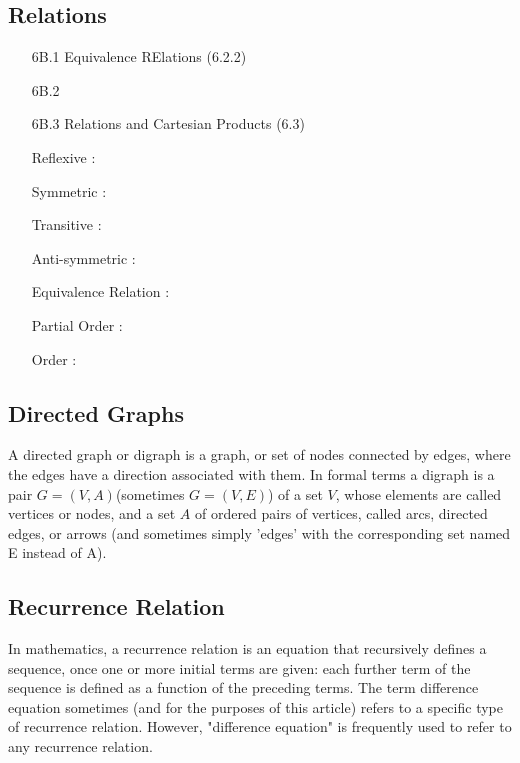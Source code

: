 \documentclass{article}
\begin{document}
\subsection*{Relations}
\begin{itemize}
\item[6B.1] Equivalence RElations (6.2.2)
\item[6B.2]
\item[6B.3] Relations and Cartesian Products (6.3)
\end{itemize}


\begin{itemize}
\item[Reflexive]: 
\item[Symmetric]: 
\item[Transitive]: 
\item[Anti-symmetric]: 
\item[Equivalence Relation]: 
\item[Partial Order]:
\item[Order]:
\end{itemize}
\newpage
\subsection*{Directed Graphs}
A directed graph or digraph is a graph, or set of nodes connected by edges, where the edges have a direction associated with them. In formal terms a digraph is a pair $G=(V,A)$(sometimes $G=(V,E)$) of a set $V$, whose elements are called vertices or nodes, and a set $A$ of ordered pairs of vertices, called arcs, directed edges, or arrows (and sometimes simply 'edges' with the corresponding set named E instead of A).


\subsection*{Recurrence Relation}
In mathematics, a recurrence relation is an equation that recursively defines a sequence, once one or more initial terms are given: each further term of the sequence is defined as a function of the preceding terms.
The term difference equation sometimes (and for the purposes of this article) refers to a specific type of recurrence relation. However, "difference equation" is frequently used to refer to any recurrence relation.


\end{document}
